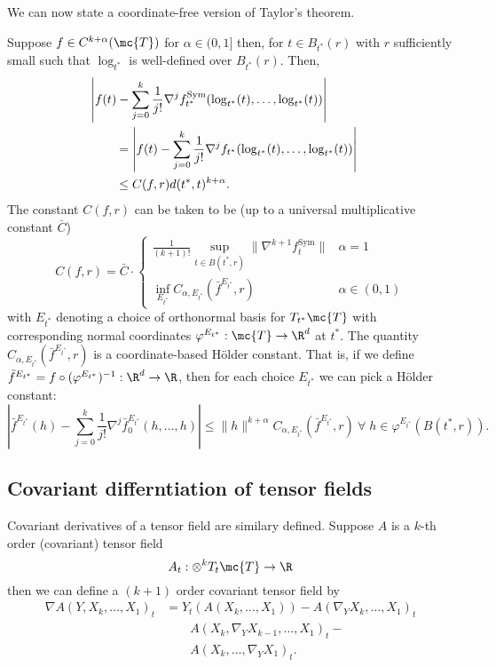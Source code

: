 \documentclass{article}
\begin{document}
We can now state a coordinate-free version of Taylor's theorem.
\begin{theorem}
\label{thm:taylor}
  Suppose $f \in C^{k+\alpha}(\mc{T})$ for $\alpha \in (0, 1]$ then, for $t \in B_{t^*}(r)$ with $r$ sufficiently small such that $\log_{t^*}$ is well-defined
    over $B_{t^*}(r)$. Then,
  \begin{equation}
    \label{eq:taylor:theorem}
\begin{aligned}
  \lefteqn{    \left|f(t) - \sum_{j=0}^k \frac{1}{j!} \nabla^j f^{\mathrm{Sym}}_{t^*}(\log_{t^*}(t), \dots, \log_{t^*}(t)) \right| } \\
  & \qquad =     \left|f(t) - \sum_{j=0}^k \frac{1}{j!} \nabla^j f_{t^*}(\log_{t^*}(t), \dots, \log_{t^*}(t)) \right| \\
  & \qquad \leq C(f,r) d(t^*,t)^{k+\alpha}.
\end{aligned}
    \end{equation}
The constant $C(f, r)$ can be taken to be (up to a universal multiplicative constant $\bar{C}$)
\begin{equation}
  C(f,r) = \bar{C} \cdot  \begin{cases} \frac{1}{(k+1)!}\sup_{t \in B(t^*,r)} \|\nabla^{k+1} f^{\mathrm{Sym}}_t\| & \alpha=1 \\
    \inf_{E_{t^*}}  C_{\alpha,E_{t^*}}(\bar{f}^{E_{t^*}}, r) & \alpha \in (0, 1)
\end{cases}
\end{equation}
  with $E_{t^*}$ denoting a choice of orthonormal basis for $T_{t^*}\mc{T}$ with corresponding
  normal coordinates $\varphi^{E_{t^*}}:\mc{T} \rightarrow \R^d$ at $t^*$. The quantity $C_{\alpha,E_{t^*}}(\bar{f}^{E_{t^*}}, r)$ is a coordinate-based H\"older constant.
  That is, if we define $\bar{f}^{E_{t^*}} = f\circ (\varphi^{E_{t^*}})^{-1}: \R^d \rightarrow \R$, then for each choice $E_{t^*}$ we can pick a H\"older constant:
  $$
\left| \bar{f}^{E_{t^*}}(h) - \sum_{j=0}^k \frac{1}{j!} \nabla^j \bar{f}^{E_{t^*}}_0(h, \dots, h) \right| \leq \|h\|^{k+\alpha} C_{\alpha, E_{t^*}}(\bar{f}^{E_{t^*}}, r) \ \forall \; h \in \varphi^{E_{t^*}}(B(t^*,r)).
  $$
  \end{theorem}

\subsection{Covariant differntiation of tensor fields}

Covariant derivatives of a tensor field are similary defined. Suppose $A$ is a $k$-th order (covariant) tensor field
$$
A_t:\otimes^k T_t\mc{T} \to \R
$$
then we can define a $(k+1)$ order covariant tensor field by
$$
\begin{aligned}
  \nabla A(Y, X_k, \dots, X_1)_t &= Y_{t}(A(X_k, \dots, X_1)) - A(\nabla_{Y}X_k, \dots, X_1)_t  \\
  &  \qquad  A(X_{k}, \nabla_{Y}X_{k-1}, \dots, X_1)_t - \\
  & \qquad A(X_{k}, \dots, \nabla_{Y}X_1)_t.
\end{aligned}
$$
\end{document}
